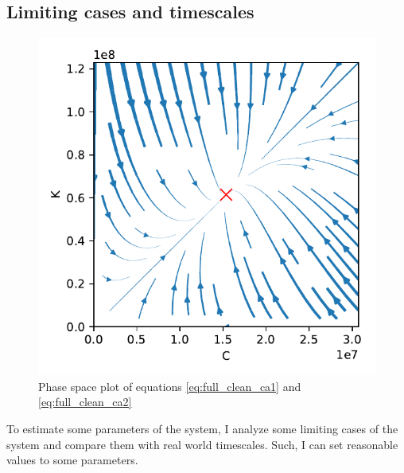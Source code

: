 \subsection{Limiting cases and timescales} 


\begin{figure}
        \hspace{-1.5 cm}\includegraphics[width = .65 \textwidth]{./figures/phasespace.pdf}
        \caption{Phase space plot of equations \eqref{eq:full_clean_ca1} and \eqref{eq:full_clean_ca2} \label{phase_space_plot}}
\end{figure}

To estimate some parameters of the system, I analyze some limiting cases of the system and compare them with real world timescales. Such, I can set reasonable values to some parameters.


